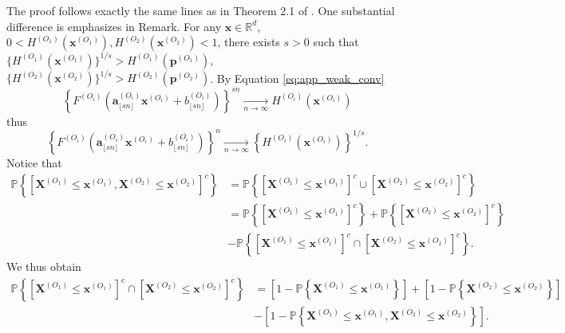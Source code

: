 \documentclass[11pt]{article}
\makeatletter
\renewenvironment{proof}[1][\proofname]{\par
\pushQED{\qed}%
\normalfont \topsep6\p@\@plus6\p@\relax
\trivlist
\item\relax
{\textbf{
#1\@addpunct{ }}}\hspace\labelsep\ignorespaces
}{%
\popQED\endtrivlist\@endpefalse
}
\makeatother
\begin{document}
	\begin{proof}
		The proof follows exactly the same lines as in Theorem 2.1 of \cite{takahashi1994asymptotic}. One substantial difference is emphasizes in Remark. 
		For any $\textbf{x} \in \mathbb{R}^d$, $0 < H^{(O_1)}(\textbf{x}^{(O_1)}), H^{(O_2)}(\textbf{x}^{(O_2)}) < 1$, there exists $s > 0$ such that $\{ H^{(O_1)}(\textbf{x}^{(O_1)}) \}^{1/s} > H^{(O_1)}(\textbf{p}^{(O_1)})$, $\{ H^{(O_2)}(\textbf{x}^{(O_2)}) \}^{1/s} > H^{(O_2)}(\textbf{p}^{(O_2)})$. By Equation \eqref{eq:app_weak_conv}
		\begin{equation*}
			\left\{ F^{(O_i)}\left(\textbf{a}_{\lfloor sn \rfloor}^{(O_i)} \textbf{x}^{(O_i)} + b_{\lfloor sn \rfloor}^{(O_i)} \right) \right\}^{sn} \underset{n \rightarrow \infty}{\longrightarrow} H^{(O_i)}(\textbf{x}^{(O_i)})
		\end{equation*}
		thus
		\begin{equation*}
			\left\{ F^{(O_i)}\left(\textbf{a}_{\lfloor sn \rfloor}^{(O_i)} \textbf{x}^{(O_i)} + b_{\lfloor sn \rfloor}^{(O_i)} \right) \right\}^{n} \underset{n \rightarrow \infty}{\longrightarrow} \left\{ H^{(O_i)}(\textbf{x}^{(O_i)}) \right\}^{1/s}.
		\end{equation*}
		Notice that
		\begin{align*}
			\mathbb{P}\left\{ \left[ \textbf{X}^{(O_1)} \leq \textbf{x}^{(O_1)}, \textbf{X}^{(O_2)} \leq \textbf{x}^{(O_2)} \right]^c \right\} &= \mathbb{P} \left\{ \left[\textbf{X}^{(O_1)} \leq \textbf{x}^{(O_1)} \right]^c \cup \left[\textbf{X}^{(O_2)} \leq \textbf{x}^{(O_2)} \right]^c \right\} \\
			&= \mathbb{P} \left\{ \left[\textbf{X}^{(O_1)} \leq \textbf{x}^{(O_1)} \right]^c \right\} + \mathbb{P} \left\{ \left[\textbf{X}^{(O_2)} \leq \textbf{x}^{(O_2)} \right]^c \right\} \\
			&- \mathbb{P} \left\{ \left[\textbf{X}^{(O_1)} \leq \textbf{x}^{(O_1)} \right]^c \cap \left[\textbf{X}^{(O_2)} \leq \textbf{x}^{(O_2)} \right]^c \right\}.
		\end{align*}
		We thus obtain 
		\begin{align*}
		\mathbb{P} \left\{ \left[\textbf{X}^{(O_1)} \leq \textbf{x}^{(O_1)} \right]^c \cap \left[\textbf{X}^{(O_2)} \leq \textbf{x}^{(O_2)} \right]^c \right\} & = \left[ 1-\mathbb{P} \left\{ \textbf{X}^{(O_1)} \leq \textbf{x}^{(O_1)} \right\} \right] + \left[ 1 - \mathbb{P} \left\{ \textbf{X}^{(O_2)} \leq \textbf{x}^{(O_2)} \right\} \right] \\ &- \left[ 1- \mathbb{P}\left\{ \textbf{X}^{(O_1)} \leq \textbf{x}^{(O_1)}, \textbf{X}^{(O_2)} \leq \textbf{x}^{(O_2)} \right\} \right].

\end{align*}
\end{proof}
\end{document}
